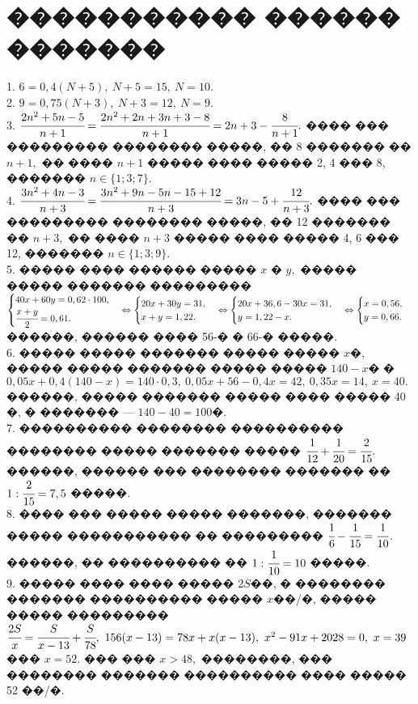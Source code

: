 \documentclass[12pt]{article}
\begin{document}
\section{����������� ������ �������}
1. $6=0,4(N+5),\ N+5=15,\ N=10.$\\
2. $9=0,75(N+3),\ N+3=12,\ N=9.$\\
3. $\cfrac{2n^2+5n-5}{n+1}=\cfrac{2n^2+2n+3n+3-8}{n+1}=2n+3-\cfrac{8}{n+1}.$ ���� ��� ��������� �������� �����, �� 8 ������� �� $n+1,$ �� ���� $n+1$ ����� ���� ����� 2, 4 ��� 8, ������� $n\in \{1;3;7\}.$\\
4. $\cfrac{3n^2+4n-3}{n+3}=\cfrac{3n^2+9n-5n-15+12}{n+3}=3n-5+\cfrac{12}{n+3}.$ ���� ��� ��������� �������� �����, �� 12 ������� �� $n+3,$ �� ���� $n+3$ ����� ���� ����� 4, 6 ��� 12, ������� $n\in \{1;3;9\}.$\\
5. ����� ���� ������ ����� $x$ � $y,$ ����� ����� ������� ��������� $\begin{cases} 40x+60y=0,62\cdot100,\\ \cfrac{x+y}{2}=0,61.\end{cases}\Leftrightarrow
\begin{cases} 20x+30y=31,\\ x+y=1,22.\end{cases}\Leftrightarrow
\begin{cases} 20x+36,6-30x=31,\\ y=1,22-x.\end{cases}\Leftrightarrow
\begin{cases} x=0,56,\\ y=0,66.\end{cases}$
������, ������ ���� 56-� � 66-� �����.\\
6. ����� ����� ������� ����� ����� $x$�, ����� ����� ������� ����� ����� $140-x$� � $0,05x+0,4(140-x)=140\cdot0,3,\ 0,05x+56-0,4x=42,\ 0,35x=14,\ x=40.$ ������, ����� ������� ����� ���� ����� 40 �, � ������� --- $140-40=100$�.\\
7. ���������� �������� ���������� �������� ����� ������� ����� $\cfrac{1}{12}+\cfrac{1}{20}=\cfrac{2}{15}.$ ������, ������ ��� �������� ������� �� $1:\cfrac{2}{15}=7,5$ �����.\\
8. ���� ��� ����� ����� �������, ������� ����� ����������� �� ��������� $\cfrac{1}{6}-\cfrac{1}{15}=\cfrac{1}{10}$. ������, �� ���������� �� $1:\cfrac{1}{10}=10$ �����.\\
9. ����� ���� ���� ����� $2S$��, � �������� ������� ���������� ����� $x$��/�, ����� ����� ��������� $\cfrac{2S}{x}=\cfrac{S}{x-13}+\cfrac{S}{78},\
156(x-13)=78x+x(x-13),\ x^2-91x+2028=0,\ x=39$ ��� $x=52.$ ��� ��� $x>48,$ ��������, ��� �������� ������� ���������� ���� ����� 52 ��/�.\\
\end{document}
